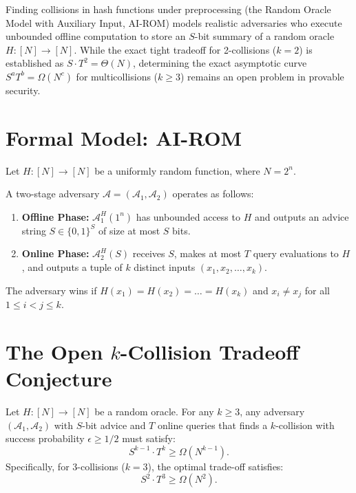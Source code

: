 \documentclass{aicr-conjecture}
\begin{document}

\vspace{0.4em}

Finding collisions in hash functions under preprocessing (the Random Oracle Model with Auxiliary Input, AI-ROM) models realistic adversaries who execute unbounded offline computation to store an $S$-bit summary of a random oracle $H : [N] \to [N]$. While the exact tight tradeoff for 2-collisions ($k=2$) is established as $S \cdot T^2 = \Theta(N)$, determining the exact asymptotic curve $S^a T^b = \Omega(N^c)$ for multicollisions ($k \ge 3$) remains an open problem in provable security.

\section{Formal Model: AI-ROM}

Let $H : [N] \to [N]$ be a uniformly random function, where $N = 2^n$.

\begin{definition}
A two-stage adversary $\mathcal{A} = (\mathcal{A}_1, \mathcal{A}_2)$ operates as follows:
\begin{enumerate}[label=\roman*.]
    \item \textbf{Offline Phase:} $\mathcal{A}_1^H(1^n)$ has unbounded access to $H$ and outputs an advice string $S \in \{0,1\}^S$ of size at most $S$ bits.
    \item \textbf{Online Phase:} $\mathcal{A}_2^H(S)$ receives $S$, makes at most $T$ query evaluations to $H$, and outputs a tuple of $k$ distinct inputs $(x_1, x_2, \dots, x_k)$.
\end{enumerate}
The adversary wins if $H(x_1) = H(x_2) = \dots = H(x_k)$ and $x_i \neq x_j$ for all $1 \le i < j \le k$.
\end{definition}

\section{The Open $k$-Collision Tradeoff Conjecture}

\begin{conjecture}
Let $H : [N] \to [N]$ be a random oracle. For any $k \ge 3$, any adversary $(\mathcal{A}_1, \mathcal{A}_2)$ with $S$-bit advice and $T$ online queries that finds a $k$-collision with success probability $\epsilon \ge 1/2$ must satisfy:
\begin{equation}
S^{k-1} \cdot T^{k} \ge \Omega\left( N^{k-1} \right).
\end{equation}
Specifically, for 3-collisions ($k=3$), the optimal trade-off satisfies:
\begin{equation}
S^2 \cdot T^3 \ge \Omega\left( N^2 \right).
\end{equation}
\end{conjecture}
\end{document}
